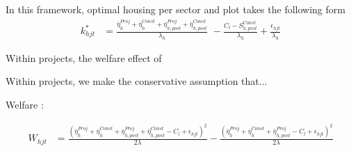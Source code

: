\documentclass[12pt]{article}
\begin{document}
In this framework, optimal housing per sector and plot takes the following form
\begin{align*}
k_{hjt}^{*} &= \frac{    \overline{\eta}_{h}^{Proj} + \overline{\eta}_{h}^{Const} + \overline{\eta}_{h,post}^{Proj} + \overline{\eta}_{h,post}^{Const}     }{\lambda_h} \,\, - \frac{C_l-S^{Const}_{h,post} }{\lambda_h} + \frac{\epsilon_{hjt}}{\lambda_h}
\end{align*}


Within projects,  the welfare effect of 

Within projects, we make the conservative assumption that...

Welfare : 

\begin{align*}
W_{hjt}  &= \frac{( \overline{\eta}_{h}^{Proj} + \overline{\eta}_{h}^{Const} + \overline{\eta}_{h,post}^{Proj} + \overline{\eta}_{h,post}^{Const}   -C_l + \epsilon_{hjt} )^2}{2\lambda} - \frac{( \overline{\eta}_{h}^{Proj} + \overline{\eta}_{h}^{Const} + \overline{\eta}_{h,post}^{Proj}  - C_l + \epsilon_{hjt} )^2}{2\lambda}
\end{align*}









\end{document}
